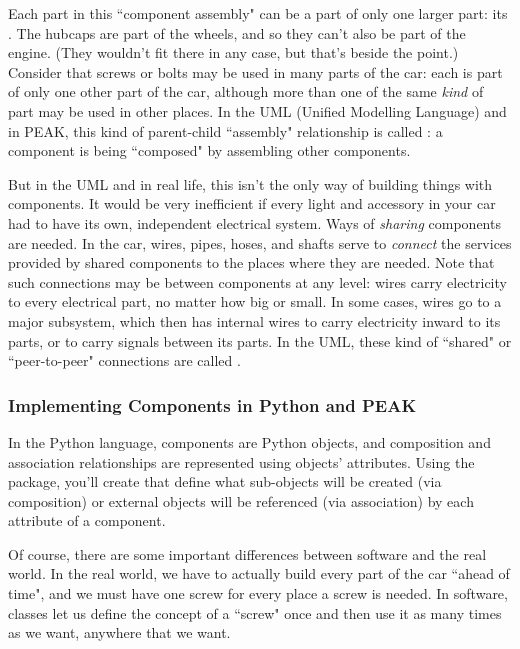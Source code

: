 Each part in this ``component assembly" can be a part of only one larger part:
its .  The hubcaps are part of the wheels,
and so they can't also be part of the engine.  (They wouldn't fit there in
any case, but that's beside the point.)  Consider that screws or bolts may
be used in many parts of the car: each is part of only one other part of
the car, although more than one of the same \emph{kind} of part may be used
in other places.  In the UML (Unified Modelling Language) and in PEAK, this
kind of parent-child ``assembly" relationship  is called :
a component is being ``composed" by assembling other components.

But in the UML and in real life, this isn't the only way of building things
with components.  It would be very inefficient if every light and accessory
in your car had to have its own, independent electrical system.  Ways of
\emph{sharing} components are needed.  In the car, wires, pipes, hoses, and
shafts serve to \emph{connect} the services provided by shared components to
the places where they are needed.  Note that such connections may be between
components at any level: wires carry electricity to every electrical part, no
matter how big or small.  In some cases, wires go to a major subsystem, which
then has internal wires to carry electricity inward to its parts, or to carry
signals between its parts.  In  the UML, these kind of ``shared" or
``peer-to-peer" connections are called .














\subsubsection{Implementing Components in Python and PEAK}

In the Python language, components are Python objects, and composition and
association relationships are represented using objects' attributes.  Using
the  package, you'll create 
that  define what sub-objects will be created (via composition) or external
objects  will be referenced (via association) by each attribute of a component.

Of course, there are some important differences between software and the real
world.  In the real world, we have to actually build every part of the car
``ahead of time", and we must have one screw for every place a screw is needed.
In software, classes let us define the concept of a ``screw" once and then use
it as many times as we want, anywhere that we want.


